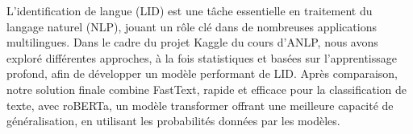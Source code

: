 L’identification de langue (LID) est une tâche essentielle en traitement du langage naturel (NLP), jouant un rôle clé dans de nombreuses applications multilingues. Dans le cadre du projet Kaggle du cours d’ANLP, nous avons exploré différentes approches, à la fois statistiques et basées sur l’apprentissage profond, afin de développer un modèle performant de LID. Après comparaison, notre solution finale combine FastText, rapide et efficace pour la classification de texte, avec roBERTa, un modèle transformer offrant une meilleure capacité de généralisation, en utilisant les probabilités données par les modèles.
